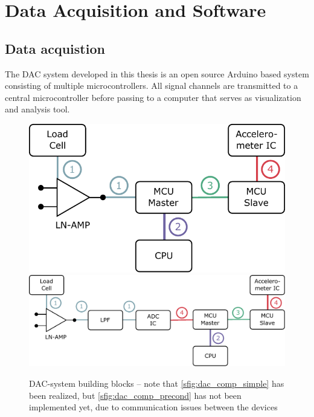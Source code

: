 \chapter{Data Acquisition and Software}
\label{chap:\currfilebase}


\section{Data acquistion}

The \ac{DAC} system developed in this thesis is an open source Arduino based system consisting of multiple microcontrollers. All signal channels are transmitted to a central microcontroller before passing to a computer that serves as visualization and analysis tool.

\begin{figure}[!htb]
    \centering
        {\includegraphics[scale=0.5]{figures/dac/dac_components/dac_comp_simple}}
        \hfill
        {\includegraphics[scale=0.5]{figures/dac/dac_components/dac_comp_precond}}
    \\[0.5em]
    \caption[DAC building blocks]{\acs{DAC}-system building blocks -- note that \ref{sfig:dac_comp_simple} has been realized, but \ref{sfig:dac_comp_precond} has not been implemented yet, due to communication issues between the devices}
    \label{fig:dac_building_blocks}
\end{figure}

